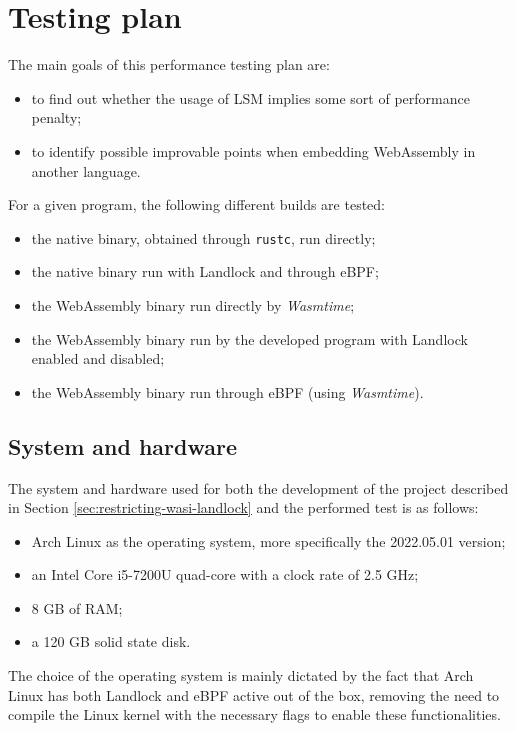 \section{Testing plan}

The main goals of this performance testing plan are:
\begin{itemize}
  \item to find out whether the usage of LSM implies some sort of performance penalty;
  \item to identify possible improvable points when embedding WebAssembly in another language.
\end{itemize}

\noindent
For a given program, the following different builds are tested:
\begin{itemize}
  \item the native binary, obtained through \texttt{rustc}, run directly;
  \item the native binary run with Landlock and through eBPF;
  \item the WebAssembly binary run directly by \textit{Wasmtime};
  \item the WebAssembly binary run by the developed program with Landlock enabled and disabled;
  \item the WebAssembly binary run through eBPF (using \textit{Wasmtime}).
\end{itemize}

\subsection{System and hardware}

The system and hardware used for both the development of the project described in Section \ref{sec:restricting-wasi-landlock}
and the performed test is as follows:
\begin{itemize}
  \item Arch Linux as the operating system, more specifically the 2022.05.01 version;
  \item an Intel Core i5-7200U quad-core with a clock rate of 2.5 GHz;
  \item 8 GB of RAM;
  \item a 120 GB solid state disk.
\end{itemize}

The choice of the operating system is mainly dictated by the fact that Arch Linux has both Landlock and eBPF active
out of the box, removing the need to compile the Linux kernel with the necessary flags to enable these
functionalities.

